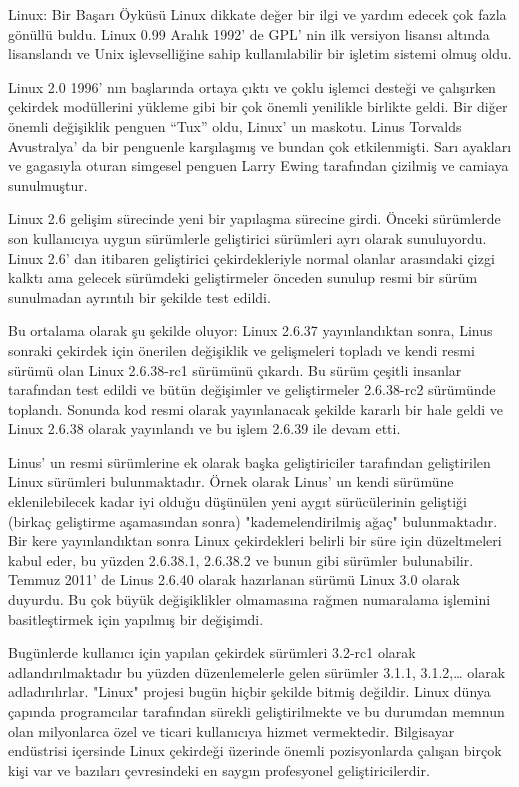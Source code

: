 \begin{section}{Linux: Bir Başarı Öyküsü}
Linux dikkate değer bir ilgi ve yardım edecek çok fazla gönüllü buldu. Linux 0.99 Aralık 1992' de GPL' nin ilk versiyon lisansı altında lisanslandı ve Unix işlevselliğine sahip kullanılabilir bir işletim sistemi olmuş oldu.

Linux 2.0 1996' nın başlarında ortaya çıktı ve çoklu işlemci desteği ve çalışırken çekirdek modüllerini yükleme gibi bir çok önemli yenilikle birlikte geldi. Bir diğer önemli değişiklik penguen “Tux” oldu, Linux’ un maskotu.  Linus Torvalds Avustralya’ da bir penguenle karşılaşmış ve bundan çok etkilenmişti. Sarı ayakları ve gagasıyla oturan simgesel penguen Larry Ewing tarafından çizilmiş ve camiaya sunulmuştur.

Linux 2.6 gelişim sürecinde yeni bir yapılaşma sürecine girdi. Önceki sürümlerde son kullanıcıya uygun sürümlerle geliştirici sürümleri ayrı olarak sunuluyordu. Linux 2.6' dan itibaren geliştirici çekirdekleriyle normal olanlar arasındaki çizgi kalktı ama gelecek sürümdeki geliştirmeler önceden sunulup resmi bir sürüm sunulmadan ayrıntılı bir şekilde test edildi.

Bu ortalama olarak şu şekilde oluyor: Linux 2.6.37 yayınlandıktan sonra, Linus sonraki çekirdek için önerilen değişiklik ve gelişmeleri topladı ve kendi resmi sürümü olan Linux 2.6.38-rc1 sürümünü çıkardı. Bu sürüm çeşitli insanlar tarafından test edildi ve bütün değişimler ve geliştirmeler 2.6.38-rc2 sürümünde toplandı. Sonunda kod resmi olarak yayınlanacak şekilde kararlı bir hale geldi ve Linux 2.6.38 olarak yayınlandı ve bu işlem 2.6.39 ile devam etti.

Linus’ un resmi sürümlerine ek olarak başka geliştiriciler tarafından geliştirilen Linux sürümleri bulunmaktadır. Örnek olarak Linus' un kendi sürümüne eklenilebilecek kadar iyi olduğu düşünülen yeni aygıt sürücülerinin geliştiği (birkaç geliştirme aşamasından sonra) "kademelendirilmiş ağaç" bulunmaktadır. Bir kere yayınlandıktan sonra Linux çekirdekleri belirli bir süre için düzeltmeleri kabul eder, bu yüzden 2.6.38.1, 2.6.38.2 ve bunun gibi sürümler bulunabilir. Temmuz 2011’ de Linus 2.6.40 olarak hazırlanan sürümü Linux 3.0 olarak duyurdu. Bu çok büyük değişiklikler olmamasına rağmen numaralama işlemini basitleştirmek için yapılmış bir değişimdi.

Bugünlerde kullanıcı için yapılan çekirdek sürümleri 3.2-rc1 olarak adlandırılmaktadır bu yüzden düzenlemelerle gelen sürümler 3.1.1, 3.1.2,… olarak adladırılırlar. "Linux" projesi bugün hiçbir şekilde bitmiş değildir. Linux dünya çapında programcılar tarafından sürekli geliştirilmekte ve bu  durumdan memnun olan milyonlarca özel ve ticari kullanıcıya hizmet vermektedir. Bilgisayar endüstrisi içersinde  Linux çekirdeği üzerinde  önemli pozisyonlarda çalışan birçok kişi var ve bazıları çevresindeki en saygın profesyonel geliştiricilerdir.


\end{section}
